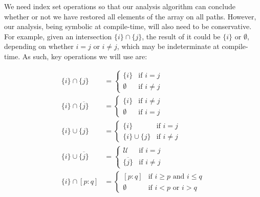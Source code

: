We need index set operations so that our analysis algorithm can conclude whether or not we have restored all elements of the array on all paths.
However, our analysis, being symbolic at compile-time, will also need to be conservative.
For example, given an intersection $\{i\} \cap \{j\}$, the result of it could be  $\{i\}$ or $\emptyset$, depending on whether $i=j$ or $i\ne j$, which may be indeterminate at compile-time.
As such, key operations we will use are:

\begin{align*}
\{i\}\cap {\{j\}} &= \left\{ \begin{array}{ccl}  \{i\} & \mbox{if }  i = j \\ \emptyset & \mbox{if }  i \ne j  \end{array}\right. \\
\{i\}\cap \overline{\{j\}} &= \left\{ \begin{array}{cc}  \{i\} & \mbox{if }  i \ne j \\ \emptyset & \mbox{if }  i = j \end{array}\right. \\
\{i\}\cup {\{j\}} &= \left\{ \begin{array}{cc}  \{i\} & \mbox{if } i = j \\ \{i\}\cup {\{j\}}  & \mbox{if }  i \ne j \end{array}\right. \\
\{i\}\cup \overline{\{j\}} &= \left\{ \begin{array}{cc}  \mathcal{U} & \mbox{if } i = j \\ \overline{\{j\}} & \mbox{if }  i \ne j \end{array}\right. \\
\{i\}\cap [p:q] &= \left\{ \begin{array}{cc}  [p:q] & \mbox{if } i \ge p \mbox{ and } i\le q \\ {\emptyset} & \mbox{if } i < p \mbox{ or } i> q \end{array}\right. 
\end{align*}


